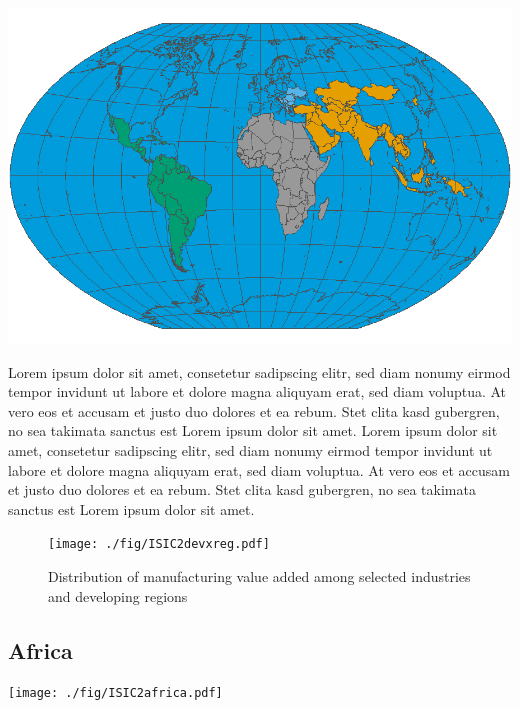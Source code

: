 \documentclass[
  openany, nofonts]{tufte-book}
\begin{document}
\begin{marginfigure}
\includegraphics[width=1\linewidth]{./img/GROUP_DEVXREGwintri.png} \end{marginfigure}

Lorem ipsum dolor sit amet, consetetur sadipscing elitr, sed diam nonumy eirmod tempor invidunt ut labore et dolore magna aliquyam erat, sed diam voluptua. At vero eos et accusam et justo duo dolores et ea rebum. Stet clita kasd gubergren, no sea takimata sanctus est Lorem ipsum dolor sit amet. Lorem ipsum dolor sit amet, consetetur sadipscing elitr, sed diam nonumy eirmod tempor invidunt ut labore et dolore magna aliquyam erat, sed diam voluptua. At vero eos et accusam et justo duo dolores et ea rebum. Stet clita kasd gubergren, no sea takimata sanctus est Lorem ipsum dolor sit amet.

\vspace*{\fill}

\begin{figure}
\texttt{[image: ./fig/ISIC2devxreg.pdf]} \caption[Distribution of manufacturing value added among selected industries and developing regions]{Distribution of manufacturing value added among selected industries and developing regions}\label{fig:c05-indshareDEV}
\end{figure}

\clearpage\pagebreak

\hypertarget{africa}{%
\subsection{Africa}\label{africa}}

\begin{marginfigure}
\texttt{[image: ./fig/ISIC2africa.pdf]} \end{marginfigure}
\end{document}
